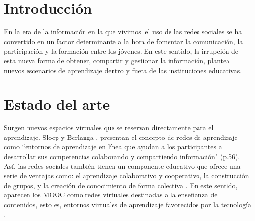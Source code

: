\documentclass[12pt]{article}
\begin{document}
\maketitle

\begin{abstract}
\noindent
\textbf{Enlace al repositorio:} \url{https://github.com/jmiguel22/proyecto_final.git}\\\\
Este trabajo tiene como objeto de estudio comprender la influencia de las interacciones entre los escenarios escolares y virtuales en los procesos de aprendizaje. As\'i pues, se ha llevado a cabo un estudio de caso de un alumno de ESO (Educaci\'on Secundaria Obligatoria) de 15 años de edad. Como herramientas de recogida de informaci\'on hemos utilizado las entrevistas en profundidad. Los resultados muestran el gran potencial que tienen las redes sociales para desarrollar el aprendizaje, la identidad y el capital social en los adolescentes.\\\\
\textbf{Palabras clave:} Aprendizaje, Redes sociales

\end{abstract}

\section{Introducci\'on}
En la era de la informaci\'on en la que vivimos, el uso de las redes sociales se ha convertido en un factor determinante a la hora de fomentar la comunicaci\'on, la participaci\'on y la formaci\'on entre los j\'ovenes. En este sentido, la irrupci\'on de esta nueva forma de obtener, compartir y gestionar la informaci\'on, plantea nuevos escenarios de aprendizaje dentro y fuera de las instituciones educativas. 

\section{Estado del arte}
Surgen nuevos espacios virtuales que se reservan directamente para el aprendizaje. Sloep y Berlanga \cite{sloep_learning_2011}, presentan el concepto de redes de aprendizaje como ``entornos de aprendizaje en l\'inea que ayudan a los participantes a desarrollar sus competencias colaborando y compartiendo informaci\'on" (p.56). As\'i, las redes sociales tambi\'en tienen un componente educativo que ofrece una serie de ventajas como: el aprendizaje colaborativo y cooperativo, la construcci\'on de grupos, y la creaci\'on de conocimiento de forma colectiva \cite{ortega_espacios_2008}. En este sentido, aparecen los MOOC como redes virtuales destinadas a la enseñanza de contenidos, esto es, entornos virtuales de aprendizaje favorecidos por la tecnolog\'ia \cite{bartolome-pina_are_2015}.
\end{document}
